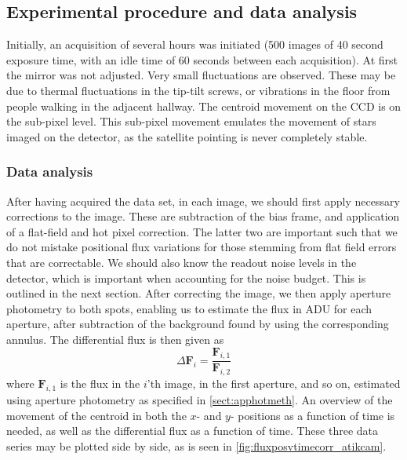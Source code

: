 \documentclass[../main.tex]{subfiles}
\begin{document}
\subsection{Experimental procedure and data analysis}
Initially, an acquisition of several hours  was initiated (500 images of 40 second exposure time, with an idle time of 60 seconds between each acquisition). At first the mirror was not adjusted. Very small fluctuations are observed. These may be due to thermal fluctuations in the tip-tilt screws, or vibrations in the floor from people walking in the adjacent hallway. The centroid movement on the CCD is on the sub-pixel level. This sub-pixel movement emulates the movement of stars imaged on the detector, as the satellite pointing is never completely stable. 

\subsubsection{Data analysis}
After having acquired the data set, in each image, we should first apply necessary corrections to the image. These are subtraction of the bias frame, and application of a flat-field and hot pixel correction. The latter two are important such that we do not mistake positional flux variations for those stemming from flat field errors that are correctable. We should also know the readout noise levels in the detector, which is important when accounting for the noise budget. This is outlined in the next section. After correcting the image, we then apply aperture photometry to both spots, enabling us to estimate the flux in ADU for each aperture, after subtraction of the background found by using the corresponding annulus. The differential flux is then given as
\begin{equation}
	\Delta\bm F_i = \frac{\bm F_{i, 1}}{\bm F_{i, 2}}
\end{equation}
where $\bm F_{i, 1}$ is the flux in the $i$'th image, in the first aperture, and so on, estimated using aperture photometry as specified in \ref{sect:apphotmeth}. An overview of the movement of the centroid in both the $x$- and $y$- positions as a function of time is needed, as well as the differential flux as a function of time. These three data series may be plotted side by side, as is seen in \ref{fig:fluxposvtimecorr_atikcam}. 
\end{document}
